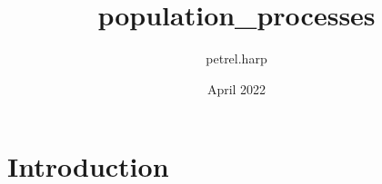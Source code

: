 \documentclass{article}
\title{population_processes}
\author{petrel.harp }
\date{April 2022}
\begin{document}
\maketitle

\section{Introduction}
\end{document}
